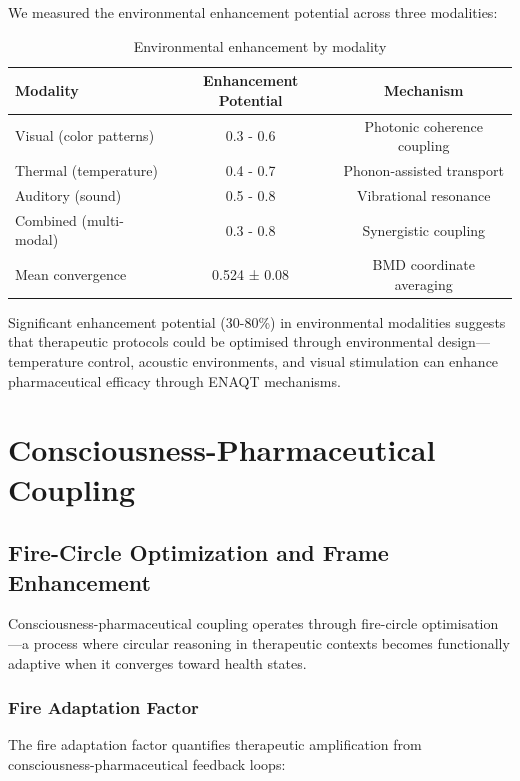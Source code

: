 \documentclass{article}
\theoremstyle{definition}
\theoremstyle{remark}
\begin{document}
We measured the environmental enhancement potential across three modalities:

\begin{table}[h]
\centering
\caption{Environmental enhancement by modality}
\label{tab:environmental_enhancement}
\begin{tabular}{lcc}
\toprule
\textbf{Modality} & \textbf{Enhancement Potential} & \textbf{Mechanism} \\
\midrule
Visual (color patterns) & 0.3 - 0.6 & Photonic coherence coupling \\
Thermal (temperature) & 0.4 - 0.7 & Phonon-assisted transport \\
Auditory (sound) & 0.5 - 0.8 & Vibrational resonance \\
\midrule
Combined (multi-modal) & 0.3 - 0.8 & Synergistic coupling \\
Mean convergence & 0.524 ± 0.08 & BMD coordinate averaging \\
\bottomrule
\end{tabular}
\end{table}

Significant enhancement potential (30-80\%) in environmental modalities suggests that therapeutic protocols could be optimised through environmental design—temperature control, acoustic environments, and visual stimulation can enhance pharmaceutical efficacy through ENAQT mechanisms.

\section{Consciousness-Pharmaceutical Coupling}

\subsection{Fire-Circle Optimization and Frame Enhancement}

Consciousness-pharmaceutical coupling operates through fire-circle optimisation—a process where circular reasoning in therapeutic contexts becomes functionally adaptive when it converges toward health states.

\subsubsection{Fire Adaptation Factor}

The fire adaptation factor quantifies therapeutic amplification from consciousness-pharmaceutical feedback loops:
\end{document}
